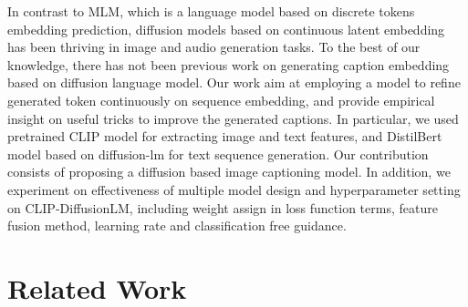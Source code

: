 \documentclass{article}
\begin{document}
In contrast to MLM, which is a language model based on discrete tokens embedding prediction, diffusion models based on continuous latent embedding has been thriving in image and audio generation tasks\cite{dalle2, https://doi.org/10.48550/arxiv.2205.11487,glide,DBLP:journals/corr/abs-2105-06337,https://doi.org/10.48550/arxiv.2207.09983}. To the best of our knowledge, there has not been previous work on generating caption embedding based on diffusion language model. Our work aim at employing a model to refine generated token continuously on sequence embedding, and provide empirical insight on useful tricks to improve the generated captions. In particular, we used pretrained CLIP\cite{clip} model for extracting image and text features, and DistilBert\cite{distilbert} model based on diffusion-lm\cite{diffuselm} for text sequence generation. Our contribution consists of proposing a diffusion based image captioning model{}. In addition, we experiment on effectiveness of multiple model design and hyperparameter setting on CLIP-DiffusionLM, including weight assign in loss function terms{}, feature fusion method{}, learning rate{} and classification free guidance{}.

\section{Related Work}
\label{sec:headings}
\end{document}
